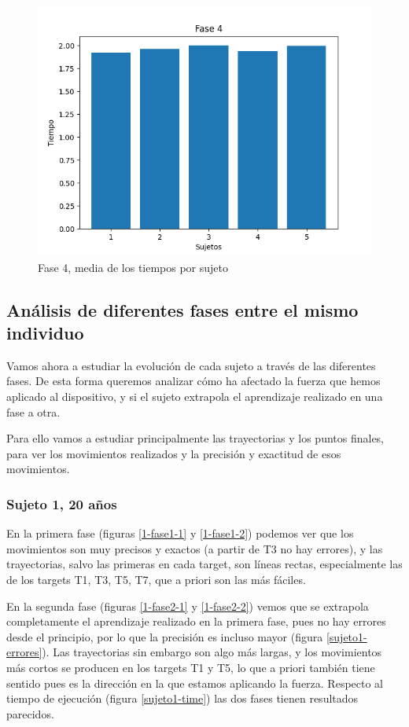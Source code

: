 \documentclass[a4paper,11pt, oneside]{book}
\begin{document}
\begin{figure}[H]
	\includegraphics[width=\linewidth]{fase4-time}
	\caption{Fase 4, media de los tiempos por sujeto}
	\label{fase4-time}
\end{figure}




\subsection{Análisis de diferentes fases entre el mismo individuo}

Vamos ahora a estudiar la evolución de cada sujeto a través de las diferentes fases. De esta forma queremos analizar cómo ha afectado la fuerza que hemos aplicado al dispositivo, y si el sujeto extrapola el aprendizaje realizado en una fase a otra.

Para ello vamos a estudiar principalmente las trayectorias y los puntos finales, para ver los movimientos realizados y la precisión y exactitud de esos movimientos.

\subsubsection{Sujeto 1, 20 años}

En la primera fase (figuras \ref{1-fase1-1} y \ref{1-fase1-2}) podemos ver que los movimientos son muy precisos y exactos (a partir de T3 no hay errores), y las trayectorias, salvo las primeras en cada target, son líneas rectas, especialmente las de los targets T1, T3, T5, T7, que a priori son las más fáciles.

En la segunda fase (figuras \ref{1-fase2-1} y \ref{1-fase2-2}) vemos que se extrapola completamente el aprendizaje realizado en la primera fase, pues no hay errores desde el principio, por lo que la precisión es incluso mayor (figura \ref{sujeto1-errores}). Las trayectorias sin embargo son algo más largas, y los movimientos más cortos se producen en los targets T1 y T5, lo que a priori también tiene sentido pues es la dirección en la que estamos aplicando la fuerza. Respecto al tiempo  de ejecución (figura \ref{sujeto1-time}) las dos fases tienen resultados parecidos.
\end{document}
